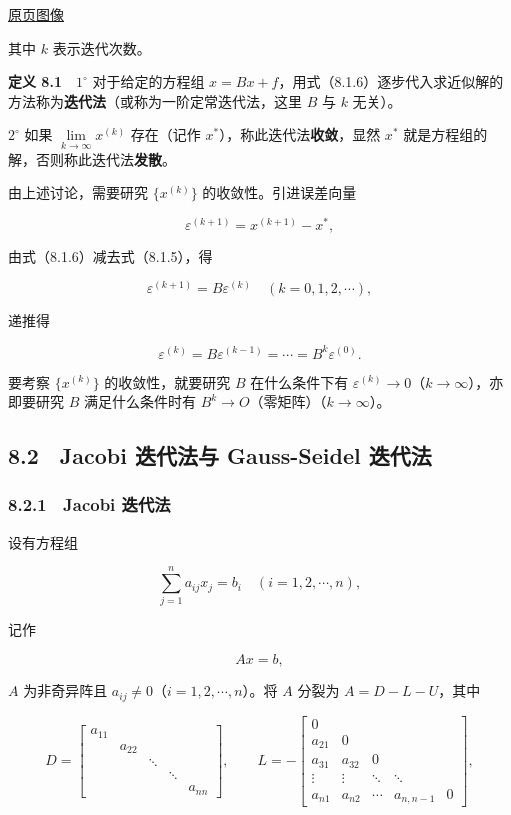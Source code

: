 \documentclass[
  10pt,
  fontset=fandol]{ctexart}
\begin{document}
\href{../../source-images/pdf-217.jpeg}{原页图像}

其中 \(k\) 表示迭代次数。

\textbf{定义 8.1}　\(1^\circ\) 对于给定的方程组 \(x=Bx+f\)，用式（8.1.6）逐步代入求近似解的方法称为\textbf{迭代法}（或称为一阶定常迭代法，这里 \(B\) 与 \(k\) 无关）。

\(2^\circ\) 如果 \(\lim\limits_{k\to\infty}x^{(k)}\) 存在（记作 \(x^*\)），称此迭代法\textbf{收敛}，显然 \(x^*\) 就是方程组的解，否则称此迭代法\textbf{发散}。

由上述讨论，需要研究 \(\{x^{(k)}\}\) 的收敛性。引进误差向量

\[
\varepsilon^{(k+1)}=x^{(k+1)}-x^*,
\]

由式（8.1.6）减去式（8.1.5），得

\[
\varepsilon^{(k+1)}=B\varepsilon^{(k)}\quad(k=0,1,2,\cdots),
\]

递推得

\[
\varepsilon^{(k)}=B\varepsilon^{(k-1)}=\cdots=B^k\varepsilon^{(0)}.
\]

要考察 \(\{x^{(k)}\}\) 的收敛性，就要研究 \(B\) 在什么条件下有 \(\varepsilon^{(k)}\to0\)（\(k\to\infty\)），亦即要研究 \(B\) 满足什么条件时有 \(B^k\to O\)（零矩阵）（\(k\to\infty\)）。

\subsection{8.2　Jacobi 迭代法与 Gauss-Seidel 迭代法}\label{jacobi-ux8fedux4ee3ux6cd5ux4e0e-gauss-seidel-ux8fedux4ee3ux6cd5}

\subsubsection{8.2.1　Jacobi 迭代法}\label{jacobi-ux8fedux4ee3ux6cd5}

设有方程组

\[
\sum_{j=1}^n a_{ij}x_j=b_i\quad(i=1,2,\cdots,n),
\]

记作

\[
Ax=b,
\tag{8.2.1}
\]

\(A\) 为非奇异阵且 \(a_{ij}\neq0\)（\(i=1,2,\cdots,n\)）。将 \(A\) 分裂为 \(A=D-L-U\)，其中

\[
D=\begin{bmatrix}
a_{11}&&&&\\
&a_{22}&&&\\
&&\ddots&&\\
&&&\ddots&\\
&&&&a_{nn}
\end{bmatrix},\qquad
L=-\begin{bmatrix}
0&&&&\\
a_{21}&0&&&\\
a_{31}&a_{32}&0&&\\
\vdots&\vdots&\ddots&\ddots&\\
a_{n1}&a_{n2}&\cdots&a_{n,n-1}&0
\end{bmatrix},
\]
\end{document}
